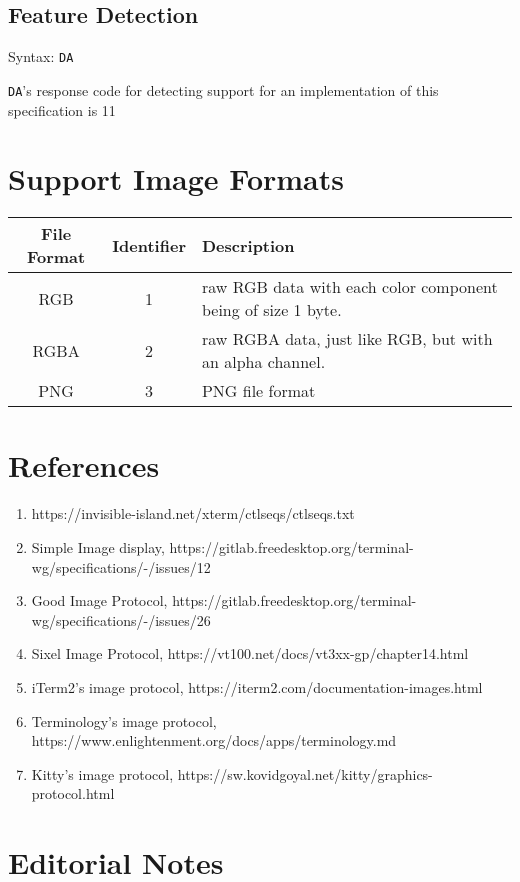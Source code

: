 \documentclass{article}
\newcommand{\code}[1]{\colorbox{light-gray}{\texttt{#1}}}
\newcommand{\DA}{\code{DA}}
\begin{document}
\subsection{Feature Detection}

Syntax: \DA

\DA's response code for detecting support for an implementation of this specification is 11

\section{Support Image Formats} %

\label{sec:supported-image-formtats}

\begin{tabular}{c | c | l}
    File Format & Identifier & Description \\ \hline
    RGB & 1 & raw RGB data with each color component being of size 1 byte. \\
    RGBA & 2 & raw RGBA data, just like RGB, but with an alpha channel. \\
    PNG & 3 & PNG file format \\
\end{tabular}

\section{References} %

\begin{enumerate}
    \item \label{ref:ctlseqs}https://invisible-island.net/xterm/ctlseqs/ctlseqs.txt
    \item \label{ref:simple-image-display}Simple Image display, https://gitlab.freedesktop.org/terminal-wg/specifications/-/issues/12
    \item \label{ref:gip}Good Image Protocol, https://gitlab.freedesktop.org/terminal-wg/specifications/-/issues/26
    \item \label{ref:image-sixel}Sixel Image Protocol, https://vt100.net/docs/vt3xx-gp/chapter14.html
    \item \label{ref:image-item2}iTerm2's image protocol, https://iterm2.com/documentation-images.html
    \item \label{ref:image-terminology}Terminology's image protocol, https://www.enlightenment.org/docs/apps/terminology.md 
    \item \label{ref:image-kitty}Kitty's image protocol, https://sw.kovidgoyal.net/kitty/graphics-protocol.html
\end{enumerate}

\section{Editorial Notes}
\listoftodos
\end{document}
